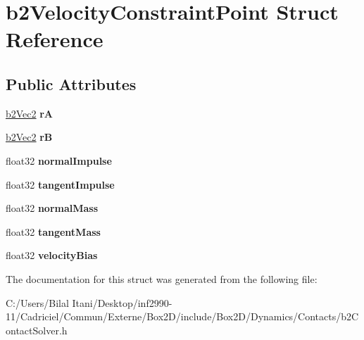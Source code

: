 \hypertarget{structb2_velocity_constraint_point}{}\section{b2\+Velocity\+Constraint\+Point Struct Reference}
\label{structb2_velocity_constraint_point}
\subsection*{Public Attributes}
\begin{DoxyCompactItemize}
\item 
\hyperlink{structb2_vec2}{b2\+Vec2} {\bfseries rA}\hypertarget{structb2_velocity_constraint_point_a0be704259cd5d3902d8581e186546e5e}{}\label{structb2_velocity_constraint_point_a0be704259cd5d3902d8581e186546e5e}

\item 
\hyperlink{structb2_vec2}{b2\+Vec2} {\bfseries rB}\hypertarget{structb2_velocity_constraint_point_ab5d1c98e09e2f859b71f6d0fda46c0d5}{}\label{structb2_velocity_constraint_point_ab5d1c98e09e2f859b71f6d0fda46c0d5}

\item 
float32 {\bfseries normal\+Impulse}\hypertarget{structb2_velocity_constraint_point_a304653be2ca1c1daa72d7b7868b37b11}{}\label{structb2_velocity_constraint_point_a304653be2ca1c1daa72d7b7868b37b11}

\item 
float32 {\bfseries tangent\+Impulse}\hypertarget{structb2_velocity_constraint_point_ac3e3be335d204bb6a89a7303831cc89b}{}\label{structb2_velocity_constraint_point_ac3e3be335d204bb6a89a7303831cc89b}

\item 
float32 {\bfseries normal\+Mass}\hypertarget{structb2_velocity_constraint_point_a5997e9781cedbd86333a84a967b59c33}{}\label{structb2_velocity_constraint_point_a5997e9781cedbd86333a84a967b59c33}

\item 
float32 {\bfseries tangent\+Mass}\hypertarget{structb2_velocity_constraint_point_a029692226a637f5e687022041b25043c}{}\label{structb2_velocity_constraint_point_a029692226a637f5e687022041b25043c}

\item 
float32 {\bfseries velocity\+Bias}\hypertarget{structb2_velocity_constraint_point_a81d492345d9b1c8f51ec10154ab840f2}{}\label{structb2_velocity_constraint_point_a81d492345d9b1c8f51ec10154ab840f2}

\end{DoxyCompactItemize}


The documentation for this struct was generated from the following file\+:\begin{DoxyCompactItemize}
\item 
C\+:/\+Users/\+Bilal Itani/\+Desktop/inf2990-\/11/\+Cadriciel/\+Commun/\+Externe/\+Box2\+D/include/\+Box2\+D/\+Dynamics/\+Contacts/b2\+Contact\+Solver.\+h\end{DoxyCompactItemize}
